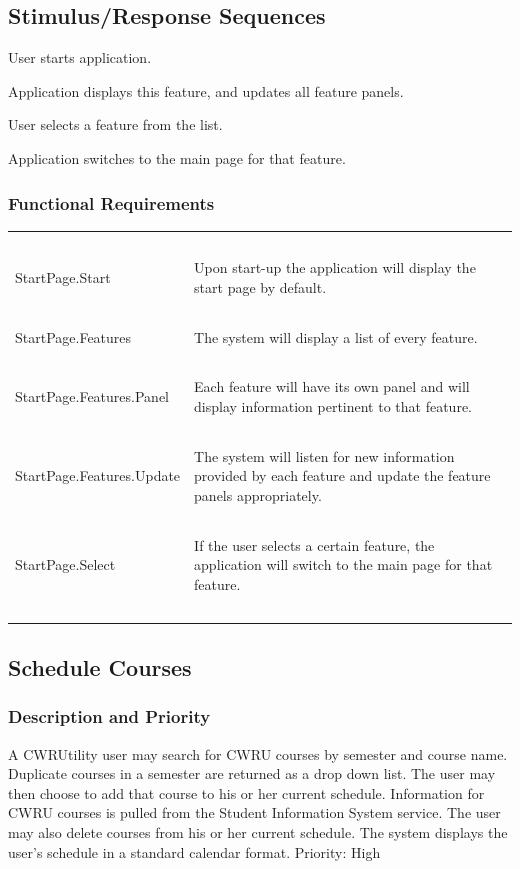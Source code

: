 \documentclass[pdftex,12pt,letter]{article}
\begin{document}
\subsection{Stimulus/Response Sequences}
\begin{description}\itemsep1pt
\item[Stimulus:] User starts application.
\item[Response:] Application displays this feature, and updates all feature panels.
\item[Stimulus:] User selects a feature from the list.
\item[Response:] Application switches to the main page for that feature.
\end{description}
\subsubsection{Functional Requirements}
\begin{table}[!h]
\begin{tabularx}{\textwidth }[t]{|l Y|}
\hline
~&~\\
StartPage.Start & Upon start-up the application will display the start page by default.\\ 
~&~\\
StartPage.Features & The system will display a list of every feature.\\
~&~\\
StartPage.Features.Panel & Each feature will have its own panel and will display information pertinent to that feature. \\
~&~\\
StartPage.Features.Update & The system will listen for new information provided by each feature and update the feature panels appropriately.\\
~&~\\
StartPage.Select & If the user selects a certain feature, the application will switch to the main page for that feature.\\
~&~\\
\hline
\end{tabularx}
\end{table}
\subsection{Schedule Courses}
\subsubsection{Description and Priority}
A CWRUtility user may search for CWRU courses by semester and course name. Duplicate courses in a semester are returned as a drop down list. The user may then choose to add that course to his or her current schedule. Information for CWRU courses is pulled from the Student Information System service. The user may also delete courses from his or her current schedule. The system displays the user's schedule in a standard calendar format. Priority: High
\end{document}
